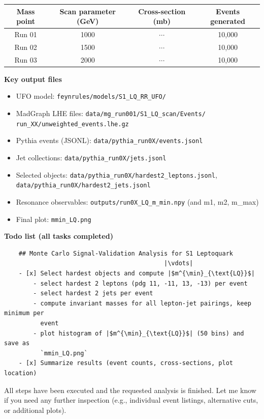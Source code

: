 \documentclass[11pt,oneside]{article}
\numberwithin{equation}{section}
\begin{document}
\begin{orchestralagentmessage}
    \begin{center}
    \begin{tabular}{cccc}
    \hline
    \textbf{Mass point} & \textbf{Scan parameter (GeV)} & \textbf{Cross-section (mb)} & \textbf{Events generated} \\
    \hline
    Run 01 & 1000 & $\cdots$ & 10,000 \\
    Run 02 & 1500 & $\cdots$ & 10,000 \\
    Run 03 & 2000 & $\cdots$ & 10,000 \\
    \hline
    \end{tabular}
    \end{center}

    \vspace{0.1in}
    \textbf{Key output files}
    \vspace{0.1in}
    \begin{itemize}
      \item UFO model: \texttt{feynrules/models/S1\_LQ\_RR\_UFO/}  
      \item MadGraph LHE files: \texttt{data/mg\_run001/S1\_LQ\_scan/Events/\\
      \quad \quad run\_XX/unweighted\_events.lhe.gz}  
      \item Pythia events (JSONL): \texttt{data/pythia\_run0X/events.jsonl}  
      \item Jet collections: \texttt{data/pythia\_run0X/jets.jsonl}  
      \item Selected objects: \texttt{data/pythia\_run0X/hardest2\_leptons.jsonl}, \\\texttt{data/pythia\_run0X/hardest2\_jets.jsonl}  
      \item Resonance observables: \texttt{outputs/run0X\_LQ\_m\_min.npy} (and m1, m2, m\_max)  
      \item Final plot: \texttt{mmin\_LQ.png}  
    \end{itemize}

    \vspace{0.1in}
    \textbf{Todo list (all tasks completed)}\vspace{-0.1in}

    \begin{verbatim}
    ## Monte Carlo Signal-Validation Analysis for S1 Leptoquark
                                            |\vdots|
    - [x] Select hardest objects and compute |$m^{\min}_{\text{LQ}}$|
        - select hardest 2 leptons (pdg 11, -11, 13, -13) per event
        - select hardest 2 jets per event
        - compute invariant masses for all lepton-jet pairings, keep minimum per 
          event
        - plot histogram of |$m^{\min}_{\text{LQ}}$| (50 bins) and save as
          `mmin_LQ.png`
    - [x] Summarize results (event counts, cross-sections, plot location)
    \end{verbatim}

    All steps have been executed and the requested analysis is finished. Let me know if you need any further inspection (e.g., individual event listings, alternative cuts, or additional plots).

\end{orchestralagentmessage}
\end{document}
